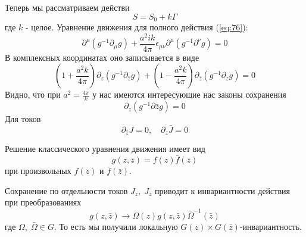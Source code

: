 \documentclass[a4paper,12pt]{article}
\theoremstyle{definition} \newtheorem{Def}{Definition}
\begin{document}
Теперь мы рассматриваем действи
\begin{equation}
  \label{eq:76}
  S=S_0+k\Gamma
\end{equation}
где $k$ - целое.
Уравнение движения для полного действия (\ref{eq:76}):
\begin{equation}
  \label{eq:77}
  \partial^{\mu}(g^{-1}\partial_{\mu}g)+\frac{a^2 ik}{4\pi}\epsilon_{\mu\nu}\partial^{\mu}(g^{-1}\partial^{\nu}g)=0
\end{equation}
В комплексных координатах оно записывается в виде
\begin{equation}
  \label{eq:78}
  (1+\frac{a^2 k}{4\pi})\partial_z(g^{-1}\partial_{\bar z}g)+(1-\frac{a^2 k}{4\pi})\partial_{\bar z}(g^{-1}\partial_z g)=0
\end{equation}
Видно, что при $a^2=\frac{4\pi}{k}$ у нас имеются интересующие нас законы сохранения
\begin{equation}
  \label{eq:79}
  \partial_z(g^{-1}\partial{\bar z}g)=0
\end{equation}
Для токов
\begin{equation}
  \label{eq:100}
  \partial_{\bar z}J=0,\quad \partial_z \bar J=0
\end{equation}

Решение классического уравнения движения имеет вид
\begin{equation}
  \label{eq:80}
  g(z,\bar z)=f(z)\bar f(\bar z)
\end{equation}
при произвольных $f(z)$ и $\bar f (\bar z)$.

Сохранение по отдельности токов $J_z,\; J_{\bar z}$ приводит к инвариантности действия при преобразованиях
\begin{equation}
  \label{eq:81}
   g(z,\bar z)\to \Omega(z)g(z,\bar z)\bar \Omega^{-1}(\bar z)
\end{equation}
где $\Omega,\;\bar \Omega \in G$. То есть мы получили локальную $G(z)\times G(\bar z)$-инвариантность.
\end{document}

